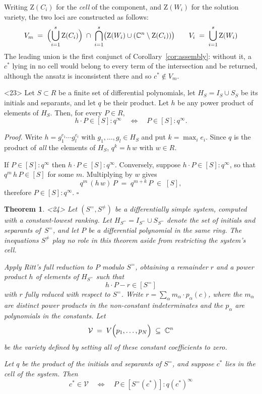 \documentclass{article}
\newtheorem{theorem}{Theorem}
\theoremstyle{definition}
\theoremstyle{plain}
\newcommand{\qedbox}{\hspace*{\fill}\ensuremath{\square}}
\begin{document}
Writing
$\mathrm{Z}(C_i)$ for the {\it cell} of the
component, and $\mathrm{Z}(W_i)$ for the solution variety,
the two loci
are constructed as follows:
%
\[
V_m \;=\; \Bigl( \bigcup_{i=1}^{s} \mathrm{Z}(C_i) \Bigr)
         \;\cap\; \bigcap_{i=1}^{s} \bigl( \mathrm{Z}(W_i) \cup (\mathbb{C}^n \setminus \mathrm{Z}(C_i)) \bigr)
\qquad
V_i \;=\; \bigcup_{i=1}^{s} \mathrm{Z}(W_i)
\]
%
\noindent
The leading union is the first conjunct of Corollary~\ref{cor:assembly}: without
it, a $c^*$ lying in no cell would belong to every term of the intersection and
be returned, although the ansatz is inconsistent there and so $c^* \notin V_m$.

\medskip
\begin{lemma}<23>
\label{lem:saturation-cancellation}
Let $S \subset R$ be a finite set of differential polynomials, let
$H_S = I_S \cup S_S$ be its initials and separants, and let $q$ be their
product.  Let $h$ be any power product of elements of $H_S$.  Then, for every
$P \in R$,
%
\[
h \cdot P \in [S] : q^\infty
\quad\Longleftrightarrow\quad
P \in [S] : q^\infty .
\]
\end{lemma}

{\it Proof.}
Write $h = g_1^{e_1} \cdots g_l^{e_l}$ with $g_1, \ldots, g_l \in H_S$ and put
$k = \max_i e_i$.  Since $q$ is the product of {\it all} the elements of
$H_S$, $q^k = h\,w$ with $w \in R$.

If $P \in [S] : q^\infty$ then $h \cdot P \in [S] : q^\infty$.
Conversely, suppose $h \cdot P \in [S] : q^\infty$, so
that $q^m\,h\,P \in [S]$ for some $m$.  Multiplying by $w$ gives
%
\[
q^m\,(h\,w)\,P \;=\; q^{m+k}\,P \;\in\; [S] ,
\]
%
therefore $P \in [S] : q^\infty$.
\qedbox

\medskip
\begin{theorem}<24>
\label{thm:completeness}
Let $(S^=, S^{\ne})$ be a differentially simple system,
computed with a constant-lowest ranking.
Let $H_{S^=} = I_{S^=} \cup S_{S^=}$ denote the set of
initials and separants of~$S^=$, and let $P$ be a differential polynomial in
the same ring.
The inequations $S^{\ne}$ play no role in this theorem aside from
restricting the system's cell.

Apply Ritt's full reduction to $P$ modulo $S^=$, obtaining a
remainder $r$ and a power product $h$ of elements of $H_{S^=}$ such that
%
\begin{equation}
\label{ritt reduction 1}
h \cdot P - r \in [S^=]
\end{equation}
%
with $r$ fully reduced with respect to $S^=$.
Write $r = \sum_\alpha m_{\alpha} \cdot p_{\alpha}(c)$, where
the $m_{\alpha}$
are distinct power products in the non-constant indeterminates and the
$p_{\alpha}$ are polynomials in the constants.  Let
%
\[
\mathcal{V} \;=\; V\Bigl(p_1, \ldots, p_N\Bigr)
   \;\subseteq\; \mathbb{C}^n
\]
%
be the variety
defined by setting all of these constant coefficients to zero.

Let $q$ be the product of the initials and separants of $S^=$, and suppose $c^*$
lies in the cell of the system.  Then
%
\[
c^* \in \mathcal{V}
\quad\Longleftrightarrow\quad
P \in [S^=(c^*)] : q(c^*)^\infty
\]

\end{theorem}
\end{document}
